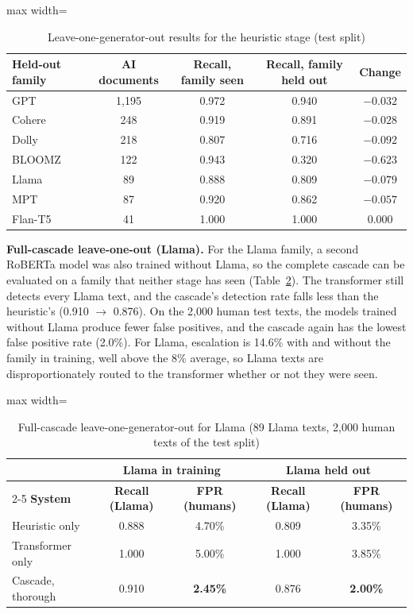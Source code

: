 \begin{table}[H]
\caption{Leave-one-generator-out results for the heuristic stage (test split)}
\label{tab:logo}
\centering
\small
\begin{adjustbox}{max width=\textwidth}\begin{tabular}{|l|c|c|c|c|}
\hline
\textbf{Held-out family} & \textbf{AI documents} & \textbf{Recall, family seen} & \textbf{Recall, family held out} & \textbf{Change} \\ \hline
GPT & 1,195 & 0.972 & 0.940 & $-0.032$ \\ \hline
Cohere & 248 & 0.919 & 0.891 & $-0.028$ \\ \hline
Dolly & 218 & 0.807 & 0.716 & $-0.092$ \\ \hline
BLOOMZ & 122 & 0.943 & 0.320 & $-0.623$ \\ \hline
Llama & 89 & 0.888 & 0.809 & $-0.079$ \\ \hline
MPT & 87 & 0.920 & 0.862 & $-0.057$ \\ \hline
Flan-T5 & 41 & 1.000 & 1.000 & $0.000$ \\ \hline
\end{tabular}\end{adjustbox}
\end{table}

\textbf{Full-cascade leave-one-out (Llama).} For the Llama family, a second
RoBERTa model was also trained without Llama, so the complete cascade can be
evaluated on a family that neither stage has seen (Table~\ref{tab:llamalogo}).
The transformer still detects every Llama text, and the cascade's detection
rate falls less than the heuristic's (0.910 $\rightarrow$ 0.876). On the 2,000
human test texts, the models trained without Llama produce fewer false
positives, and the cascade again has the lowest false positive rate (2.0\%).
For Llama, escalation is 14.6\% with and without the family in training, well
above the 8\% average, so Llama texts are disproportionately routed to the
transformer whether or not they were seen.

\begin{table}[H]
\caption{Full-cascade leave-one-generator-out for Llama (89 Llama texts, 2,000 human texts of the test split)}
\label{tab:llamalogo}
\centering
\small
\begin{adjustbox}{max width=\textwidth}\begin{tabular}{|l|c|c|c|c|}
\hline
 & \multicolumn{2}{c|}{\textbf{Llama in training}} & \multicolumn{2}{c|}{\textbf{Llama held out}} \\ \cline{2-5}
\textbf{System} & \textbf{Recall (Llama)} & \textbf{FPR (humans)} & \textbf{Recall (Llama)} & \textbf{FPR (humans)} \\ \hline
Heuristic only & 0.888 & 4.70\% & 0.809 & 3.35\% \\ \hline
Transformer only & 1.000 & 5.00\% & 1.000 & 3.85\% \\ \hline
Cascade, thorough & 0.910 & \textbf{2.45\%} & 0.876 & \textbf{2.00\%} \\ \hline
\end{tabular}\end{adjustbox}
\end{table}

